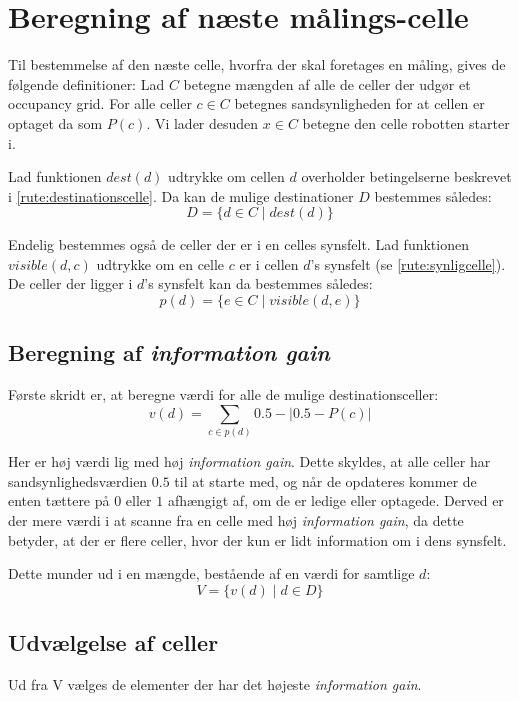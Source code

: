 \section{Beregning af næste målings-celle}\label{rute:mathintro}
Til bestemmelse af den næste celle, hvorfra der skal foretages en måling, gives de følgende definitioner:
Lad $C$ betegne mængden af alle de celler der udgør et occupancy grid.
For alle celler $c \in C$ betegnes sandsynligheden for at cellen er optaget da som $P(c)$.
Vi lader desuden $x \in C$ betegne den celle robotten starter i.

Lad funktionen $dest(d)$ udtrykke om cellen $d$ overholder betingelserne beskrevet i \cref{rute:destinationscelle}.
Da kan de mulige destinationer $D$ bestemmes således:
\begin{equation}D = \{ d \in C \mid dest(d) \}\end{equation}

Endelig bestemmes også de celler der er i en celles synsfelt.
Lad funktionen $visible(d, c)$ udtrykke om en celle $c$ er i cellen $d$'s synsfelt (se \cref{rute:synligcelle}).
De celler der ligger i $d$'s synsfelt kan da bestemmes således:
\begin{equation}p(d) = \{e \in C \mid visible(d, e)\}\end{equation}

\subsection{Beregning af \textit{information gain}}
Første skridt er, at beregne værdi for alle de mulige destinationsceller:
\begin{equation}
v(d) = \sum_{c \in p(d)} 0.5-|0.5 - P(c)|
\end{equation}

Her er høj værdi lig med høj \textit{information gain}.
Dette skyldes, at alle celler har sandsynlighedsværdien $0.5$ til at starte med, og når de opdateres kommer de enten tættere på $0$ eller $1$ afhængigt af, om de er ledige eller optagede.
Derved er der mere værdi i at scanne fra en celle med høj \textit{information gain}, da dette betyder, at der er flere celler, hvor der kun er lidt information om i dens synsfelt.

Dette munder ud i en mængde, bestående af en værdi for samtlige $d$:
\begin{equation}
V = \{ v(d) \mid d \in D \}
\end{equation}

\subsection{Udvælgelse af celler }
Ud fra V vælges de elementer der har det højeste \textit{information gain}. 


